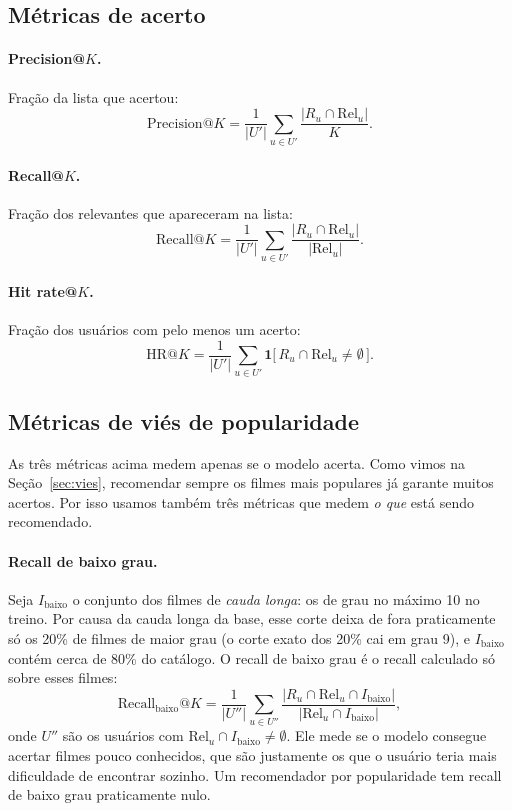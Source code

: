 \documentclass[12pt,a4paper]{article}
\theoremstyle{definition}
\begin{document}
\subsection{Métricas de acerto}

\paragraph{Precision@$K$.} Fração da lista que acertou:
\[
  \mathrm{Precision@}K = \frac{1}{|U'|} \sum_{u \in U'}
  \frac{|R_u \cap \mathrm{Rel}_u|}{K}.
\]

\paragraph{Recall@$K$.} Fração dos relevantes que apareceram na lista:
\[
  \mathrm{Recall@}K = \frac{1}{|U'|} \sum_{u \in U'}
  \frac{|R_u \cap \mathrm{Rel}_u|}{|\mathrm{Rel}_u|}.
\]

\paragraph{Hit rate@$K$.} Fração dos usuários com pelo menos um acerto:
\[
  \mathrm{HR@}K = \frac{1}{|U'|} \sum_{u \in U'}
  \mathbf{1}\bigl[\, R_u \cap \mathrm{Rel}_u \neq \emptyset \,\bigr].
\]

\subsection{Métricas de viés de popularidade}

As três métricas acima medem apenas se o modelo acerta. Como vimos na
Seção~\ref{sec:vies}, recomendar sempre os filmes mais
populares já garante muitos acertos. Por isso usamos também três métricas
que medem \emph{o que} está sendo recomendado.

\paragraph{Recall de baixo grau.}
Seja $I_{\text{baixo}}$ o conjunto dos filmes de \emph{cauda longa}: os de
grau no máximo 10 no treino. Por causa da cauda longa da base, esse corte
deixa de fora praticamente só os 20\% de filmes de maior grau (o corte
exato dos 20\% cai em grau 9), e $I_{\text{baixo}}$ contém cerca de 80\%
do catálogo. O recall de baixo grau é o recall calculado só sobre esses
filmes:
\[
  \mathrm{Recall}_{\text{baixo}}\mathrm{@}K = \frac{1}{|U''|} \sum_{u \in U''}
  \frac{|R_u \cap \mathrm{Rel}_u \cap I_{\text{baixo}}|}
       {|\mathrm{Rel}_u \cap I_{\text{baixo}}|},
\]
onde $U''$ são os usuários com $\mathrm{Rel}_u \cap I_{\text{baixo}} \neq
\emptyset$. Ele mede se o modelo consegue acertar filmes pouco conhecidos,
que são justamente os que o usuário teria mais dificuldade de encontrar
sozinho. Um recomendador por popularidade tem recall de baixo grau
praticamente nulo.
\end{document}
